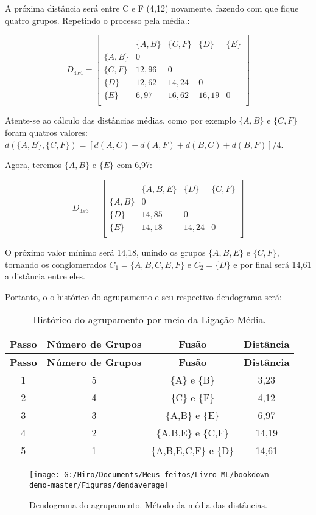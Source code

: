 \documentclass[
  openany]{book}
\begin{document}
A próxima distância será entre C e F (4,12) novamente, fazendo com que fique quatro grupos. Repetindo o processo pela média.:

\[D_{4x4}=\begin{bmatrix}\\
 &\{A,B\}& \{C,F\}&\{D\}&\{E\} \\
 \{A,B\}&0&&\\
 \{C,F\} & 12,96&0&&\\
 \{D\}& 12,62& 14,24&0&\\
 \{E\}& 6,97& 16,62& 16,19&0\\
\end{bmatrix}\]

Atente-se ao cálculo das distâncias médias, como por exemplo \(\{A,B\}\) e \(\{C,F\}\) foram quatros valores: \(d(\{A,B\},\{C,F\})=[d(A,C)+d(A,F)+d(B,C)+d(B,F)]/4\).

Agora, teremos \(\{A,B\}\) e \(\{E\}\) com 6,97:

\[D_{3x3}=\begin{bmatrix}\\
 &\{A,B,E\}& \{D\}&\{C,F\} \\
 \{A,B\}&0&\\
 \{D\} & 14,85&0&\\
 \{E\}& 14,18& 14,24&0\\
\end{bmatrix}\]

O próximo valor mínimo será 14,18, unindo os grupos \(\{A,B,E\}\) e \(\{C,F\}\), tornando os conglomerados \(C_1=\{A,B,C,E,F\}\) e \(C_2=\{D\}\) e por final será 14,61 a distância entre eles.

Portanto, o o histórico do agrupamento e seu respectivo dendograma será:

\begin{longtable}[]{@{}cccc@{}}
\caption{\label{tab:ligmedia} Histórico do agrupamento por meio da Ligação Média.}\tabularnewline
\toprule
\textbf{Passo} & \textbf{Número de Grupos} & \textbf{Fusão} & \textbf{Distância}\tabularnewline
\midrule
\endfirsthead
\toprule
\textbf{Passo} & \textbf{Número de Grupos} & \textbf{Fusão} & \textbf{Distância}\tabularnewline
\midrule
\endhead
1 & 5 & \{A\} e \{B\} & 3,23\tabularnewline
2 & 4 & \{C\} e \{F\} & 4,12\tabularnewline
3 & 3 & \{A,B\} e \{E\} & 6,97\tabularnewline
4 & 2 & \{A,B,E\} e \{C,F\} & 14,19\tabularnewline
5 & 1 & \{A,B,E,C,F\} e \{D\} & 14,61\tabularnewline
\bottomrule
\end{longtable}

\begin{figure}

{\centering \texttt{[image: G:/Hiro/Documents/Meus feitos/Livro ML/bookdown-demo-master/Figuras/dendaverage]} 

}

\caption{Dendograma do agrupamento. Método da média das distâncias.}\label{fig:dendaverage}
\end{figure}
\end{document}
